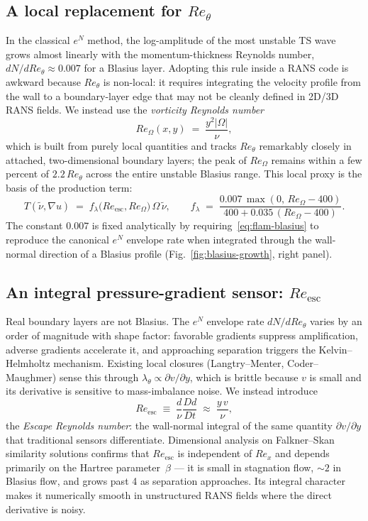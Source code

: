 \documentclass[11pt]{article}
\begin{document}
\subsection{A local replacement for $Re_\theta$}

In the classical $e^N$ method, the log-amplitude of the most unstable TS wave
grows almost linearly with the momentum-thickness Reynolds number,
$dN/dRe_\theta\!\approx\!0.007$ for a Blasius layer. Adopting this rule
inside a RANS code is awkward because $Re_\theta$ is non-local: it requires
integrating the velocity profile from the wall to a boundary-layer edge that
may not be cleanly defined in 2D/3D RANS fields. We instead use the
\emph{vorticity Reynolds number}
\begin{equation}
Re_\Omega(x,y) \;=\; \frac{y^2|\Omega|}{\nu},
\end{equation}
which is built from purely local quantities and tracks $Re_\theta$
remarkably closely in attached, two-dimensional boundary layers; the peak of
$Re_\Omega$ remains within a few percent of $2.2\,Re_\theta$ across the entire
unstable Blasius range. This local proxy is the basis of the production term:
\begin{equation}
T(\tilde\nu,\nabla u) \;=\; f_\lambda\!\big(Re_{\mathrm{esc}}, Re_\Omega\big)\,\Omega\,\tilde\nu,
\qquad
f_\lambda \;=\; \frac{0.007\,\max(0,\,Re_\Omega - 400)}{400 + 0.035\,(Re_\Omega - 400)}.
\label{eq:flam-blasius}
\end{equation}
The constant $0.007$ is fixed analytically by requiring~\eqref{eq:flam-blasius}
to reproduce the canonical $e^N$ envelope rate when integrated through the
wall-normal direction of a Blasius profile (Fig.~\ref{fig:blasius-growth},
right panel).

\subsection{An integral pressure-gradient sensor: $Re_{\mathrm{esc}}$}

Real boundary layers are not Blasius. The $e^N$ envelope rate
$dN/dRe_\theta$ varies by an order of magnitude with shape factor:
favorable gradients suppress amplification, adverse gradients accelerate it,
and approaching separation triggers the Kelvin--Helmholtz mechanism. Existing
local closures (Langtry--Menter, Coder--Maughmer) sense this through
$\lambda_\theta\!\propto\!\partial v/\partial y$, which is brittle because $v$
is small and its derivative is sensitive to mass-imbalance noise. We instead
introduce
\begin{equation}
Re_{\mathrm{esc}} \;\equiv\; \frac{d}{\nu}\frac{Dd}{Dt} \;\approx\; \frac{y\,v}{\nu},
\label{eq:Reesc}
\end{equation}
the \emph{Escape Reynolds number}: the wall-normal integral of the same
quantity $\partial v/\partial y$ that traditional sensors differentiate.
Dimensional analysis on Falkner--Skan similarity solutions confirms that
$Re_{\mathrm{esc}}$ is independent of $Re_x$ and depends primarily on the
Hartree parameter~$\beta$ --- it is small in stagnation flow, $\sim\!2$ in
Blasius flow, and grows past 4 as separation approaches. Its integral
character makes it numerically smooth in unstructured RANS fields where the
direct derivative is noisy.
\end{document}
